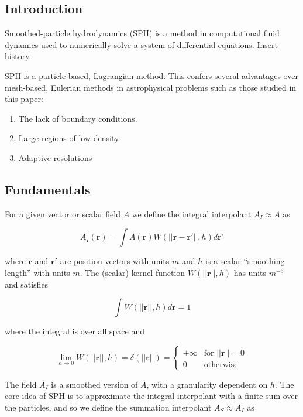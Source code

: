 \documentclass[../main.tex]{subfiles}
\begin{document}
\subsection{Introduction}
Smoothed-particle hydrodynamics (SPH) is a method in computational fluid dynamics used to
numerically solve a system of differential equations. Insert history.

SPH is a particle-based, Lagrangian method. This confers several advantages over mesh-based,
Eulerian methods in astrophysical problems such as those studied in this paper:
\begin{enumerate}
    \item The lack of boundary conditions.
    \item Large regions of low density
    \item Adaptive resolutions
\end{enumerate}

\subsection{Fundamentals}
For a given vector or scalar field $A$ we define the integral interpolant $A_I \approx A$ as

\begin{equation}
    A_I(\bm{r})
    = \int A(\bm{r}) W(||\bm{r} - \bm{r'}||, h) d\bm{r'}
\end{equation}

where $\bm{r}$ and $\bm{r'}$ are position vectors with units $m$ and $h$ is a scalar ``smoothing
length'' with units $m$. The (scalar) kernel function $W(||\bm{r}||, h)$ has units $m^{-3}$ and
satisfies

\begin{equation}
    \int W(||\bm{r}||, h) d\bm{r} = 1
\end{equation}

where the integral is over all space and

\begin{equation}
    \lim_{h\to0} W(||\bm{r}||, h)
    = \delta(||\bm{r}||)
    = \begin{cases}
        +\infty & \text{for } ||\bm{r}|| = 0 \\
        0 & \text{otherwise} \end{cases}
\end{equation}

The field $A_I$ is a smoothed version of $A$, with a granularity dependent on $h$. The core idea of
SPH is to approximate the integral interpolant with a finite sum over the particles, and so we
define the summation interpolant $A_S \approx A_I$ as
\end{document}
